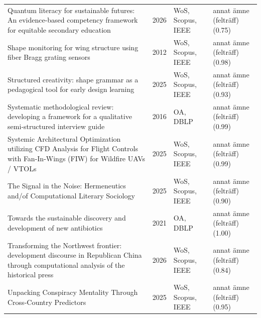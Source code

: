 \begin{longtable}{@{}%
  >{\raggedright\arraybackslash}p{}c%
  >{\raggedright\arraybackslash}p{}%
  >{\raggedright\arraybackslash}p{}@{}}
Quantum literacy for sustainable futures: An evidence-based competency framework for equitable secondary education & 2026 & WoS, Scopus, IEEE & annat ämne (felträff) (0.75) \\
Shape monitoring for wing structure using fiber Bragg grating sensors & 2012 & WoS, Scopus, IEEE & annat ämne (felträff) (0.98) \\
Structured creativity: shape grammar as a pedagogical tool for early design learning & 2025 & WoS, Scopus, IEEE & annat ämne (felträff) (0.93) \\
Systematic methodological review: developing a framework for a qualitative semi‐structured interview guide & 2016 & OA, DBLP & annat ämne (felträff) (0.99) \\
Systemic Architectural Optimization utilizing CFD Analysis for Flight Controls with Fan-In-Wings (FIW) for Wildfire UAVs / VTOLs & 2025 & WoS, Scopus, IEEE & annat ämne (felträff) (0.99) \\
The Signal in the Noise: Hermeneutics and/of Computational Literary Sociology & 2025 & WoS, Scopus, IEEE & annat ämne (felträff) (0.90) \\
Towards the sustainable discovery and development of new antibiotics & 2021 & OA, DBLP & annat ämne (felträff) (1.00) \\
Transforming the Northwest frontier: development discourse in Republican China through computational analysis of the historical press & 2026 & WoS, Scopus, IEEE & annat ämne (felträff) (0.84) \\
Unpacking Conspiracy Mentality Through Cross-Country Predictors & 2025 & WoS, Scopus, IEEE & annat ämne (felträff) (0.95) \\
\end{longtable}
\endgroup
